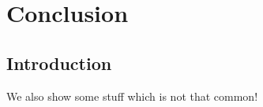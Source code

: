 
%

\chapter{Conclusion}
\label{cha:conclusion}

\glsresetall

\section{Introduction}
\label{sec:introduction}

We also show some stuff which is not that common!


